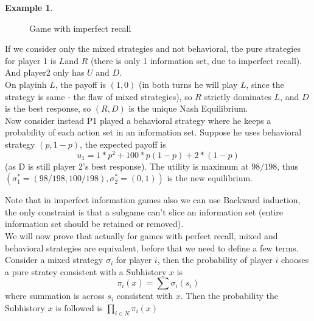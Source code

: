\documentclass{article}
\theoremstyle{definition}
\newtheorem{example}{Example}[section]
\begin{document}
\begin{example}
\begin{figure}[H]\hspace*{\fill}%
\hspace*{\fill}%
\caption{Game with imperfect recall}
\end{figure}
If we consider only the mixed strategies and not behavioral, the pure strategies for player 1 is $L$and $R$ (there is only 1 information set, due to imperfect recall). And player2 only has $U$ and $D$.\\
On playinh $L$, the payoff is $(1,0)$ (in both turns he will play $L$, since the strategy is same - the flaw of mixed strategies), so $R$ strictly dominates $L$, and $D$ is the best response, so $(R,D)$ is the unique Nash Equilibrium.\\
Now consider instead P1 played a behavioral strategy where he keeps a probability of each action set in an information set. Suppose he uses behavioral strategy $(p,1-p)$, the expected payoff is $$u_1 = 1*p^2 + 100*p(1-p) + 2*(1-p)$$ (as D is still player 2's best response). The utility is maximum at $98/198$, thus $(\sigma_1^* = (98/198,100/198),\sigma_2^*=(0,1))$ is the new equilibrium.
\end{example}
Note that in imperfect information games also we can use Backward induction, the only constraint is that a subgame can't slice an information set (entire information set should be retained or removed).\\
We will now prove that actually for games with perfect recall, mixed and behavioral strategies are equivalent, before that we need to define a few terms. Consider a mixed strategy $\sigma_i$ for player $i$, then the probability of player $i$ chooses a pure stratey consistent with a Subhistory $x$ is $$\pi_i(x) = \sum \sigma_i(s_i)$$ where summation is across $s_i$ consistent with $x$. Then the probability the Subhistory $x$ is followed is $\prod_{i\in N} \pi_i(x)$
\end{document}
